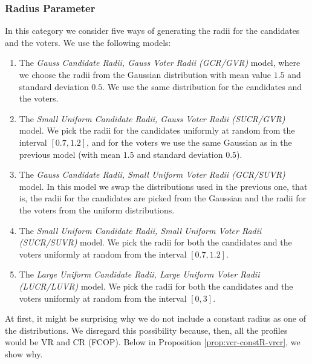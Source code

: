 \subsubsection{Radius Parameter}
In this category we consider five ways of generating the radii for the candidates and the voters.
We use the following models:

\begin{enumerate}
    \item\label{enum:radius-gaus-gaus} The \textit{Gauss Candidate Radii, Gauss Voter Radii (GCR/GVR)} model, 
    where we choose the radii from the Gaussian distribution with mean value $1.5$ and standard deviation $0.5$.
    We use the same distribution for the candidates and the voters.

    \item The \textit{Small Uniform Candidate Radii, Gauss Voter Radii (SUCR/GVR)} model.
    We pick the radii for the candidates uniformly at random from the interval $[0.7,1.2]$,
    and for the voters we use the same Gaussian as in the previous model (with mean $1.5$ and standard deviation $0.5$).

    \item The \textit{Gauss Candidate Radii, Small Uniform Voter Radii (GCR/SUVR)} model.
    In this model we swap the distributions used in the previous one,
    that is, the radii for the candidates are picked from the Gaussian
    and the radii for the voters from the uniform distributions.

    \item\label{enum:suc-suv} The \textit{Small Uniform Candidate Radii, Small Uniform Voter Radii (SUCR/SUVR)} model.
    We pick the radii for both the candidates and the voters uniformly at random from the interval $[0.7,1.2]$.

    \item The \textit{Large Uniform Candidate Radii, Large Uniform Voter Radii (LUCR/LUVR)} model.
    We pick the radii for both the candidates and the voters uniformly at random from the interval $[0,3]$.

\end{enumerate}
At first, it might be surprising why we do not include a constant radius as one of the distributions.
We disregard this possibility because, then, all the profiles would be VR and CR (FCOP).
Below in Proposition \ref{prop:vcr-constR-vrcr}, we show why.


